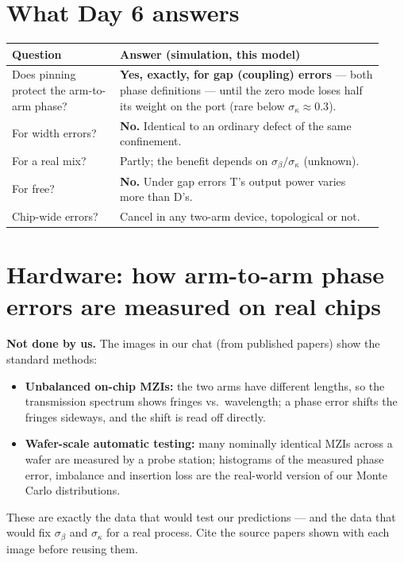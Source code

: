 \documentclass[10pt,a4paper]{article}
\begin{document}
\section{What Day 6 answers}
\begin{tabular}{@{}p{0.27\linewidth}p{0.66\linewidth}@{}}\toprule
Question & Answer (simulation, this model)\\\midrule
Does pinning protect the arm-to-arm phase? & \textbf{Yes, exactly, for gap (coupling) errors} --- both phase definitions --- until the zero mode loses half its weight on the port (rare below $\sigma_\kappa\approx0.3$).\\
For width errors? & \textbf{No.} Identical to an ordinary defect of the same confinement.\\
For a real mix? & Partly; the benefit depends on $\sigma_\beta/\sigma_\kappa$ (unknown).\\
For free? & \textbf{No.} Under gap errors T's output power varies more than D's.\\
Chip-wide errors? & Cancel in any two-arm device, topological or not.\\\bottomrule
\end{tabular}

\section{Hardware: how arm-to-arm phase errors are measured on real chips}
\textbf{Not done by us.} The images in our chat (from published papers) show the standard methods:
\begin{itemize}[itemsep=1pt]
\item \textbf{Unbalanced on-chip MZIs:} the two arms have different lengths, so the transmission spectrum shows fringes vs.\ wavelength; a phase error shifts the fringes sideways, and the shift is read off directly.
\item \textbf{Wafer-scale automatic testing:} many nominally identical MZIs across a wafer are measured by a probe station; histograms of the measured phase error, imbalance and insertion loss are the real-world version of our Monte Carlo distributions.
\end{itemize}
These are exactly the data that would test our predictions --- and the data that would fix $\sigma_\beta$ and $\sigma_\kappa$ for a real process. Cite the source papers shown with each image before reusing them.
\end{document}

